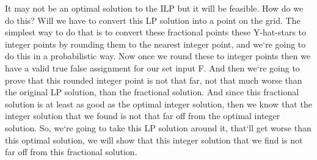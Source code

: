It may not be an optimal solution to the ILP but it will be feasible.
How do we do this? Will we have to convert this LP solution into a point on the grid.
The simplest way to do that is to convert these fractional points these Y-hat-stars to integer points by rounding them to the nearest integer point, and we`re going to do this in a probabilistic way.
Now once we round these to integer points then we have a valid true false assignment for our set input F\@.
And then we`re going to prove that this rounded integer point is not that far, not that much worse than the original LP solution, than the fractional solution.
And since this fractional solution is at least as good as the optimal integer solution, then we know that the integer solution that we found is not that far off from the optimal integer solution.
So, we`re going to take this LP solution around it, that`ll get worse than this optimal solution, we will show that this integer solution that we find is not far off from this fractional solution.

